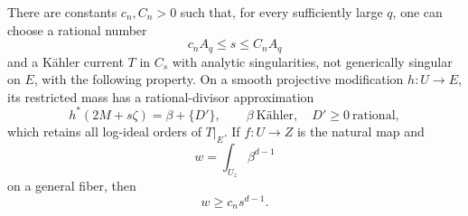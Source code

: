 \begin{lemma}\label{nv:diagonal-mass}
There are constants \(c_n,C_n>0\) such that, for every sufficiently
large \(q\), one can choose a rational number
\[
 c_nA_q\le s\le C_nA_q
\]
and a Kähler current \(T\) in \(C_s\) with analytic singularities,
not generically singular on \(E\), with the following property.  On a
smooth projective modification \(h:U\to E\), its restricted mass has
a rational-divisor approximation
\begin{equation}\label{nv:selected-decomposition}
 h^*(2M+s\zeta)=\beta+\{D'\},
 \qquad \beta\ \text{Kähler},\quad D'\ge0\ \text{rational},
\end{equation}
which retains all log-ideal orders of \(T|_E\).  If
\(f:U\to Z\) is the natural map and
\[
 w=\int_{U_z}\beta^{d-1}
\]
on a general fiber, then
\begin{equation}\label{nv:selected-w}
 w\ge c_ns^{d-1}.
\end{equation}
\end{lemma}

